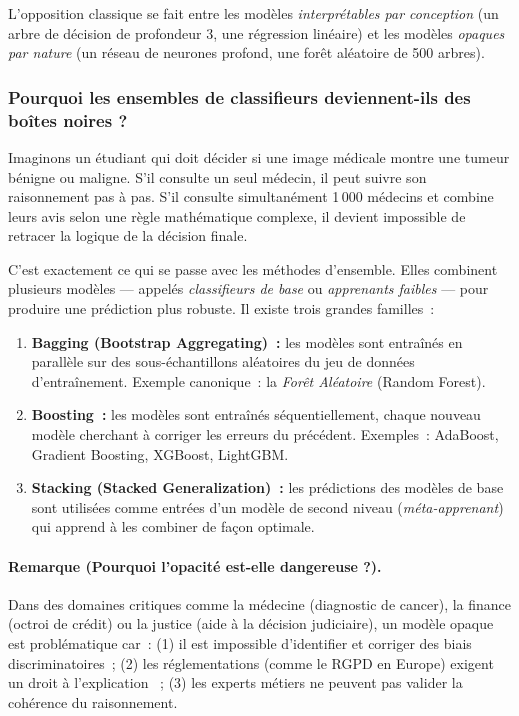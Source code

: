 L'opposition classique se fait entre les modèles \textit{interprétables par conception}
(un arbre de décision de profondeur 3, une régression linéaire) et les modèles \textit{opaques
par nature} (un réseau de neurones profond, une forêt aléatoire de 500 arbres).

\subsubsection{Pourquoi les ensembles de classifieurs deviennent-ils des boîtes noires ?}

Imaginons un étudiant qui doit décider si une image médicale montre une tumeur bénigne
ou maligne. S'il consulte un seul médecin, il peut suivre son raisonnement pas à pas.
S'il consulte simultanément 1\,000 médecins et combine leurs avis selon une règle mathématique
complexe, il devient impossible de retracer la logique de la décision finale.

C'est exactement ce qui se passe avec les méthodes d'ensemble. Elles combinent plusieurs
modèles — appelés \textit{classifieurs de base} ou \textit{apprenants faibles} — pour
produire une prédiction plus robuste. Il existe trois grandes familles~:

\begin{enumerate}
  \item \textbf{Bagging (Bootstrap Aggregating)~:} les modèles sont entraînés en parallèle sur
        des sous-échantillons aléatoires du jeu de données d'entraînement. Exemple canonique~:
        la \textit{Forêt Aléatoire} (Random Forest).

  \item \textbf{Boosting~:} les modèles sont entraînés séquentiellement, chaque nouveau modèle
        cherchant à corriger les erreurs du précédent. Exemples~: AdaBoost, Gradient Boosting,
        XGBoost, LightGBM.

  \item \textbf{Stacking (Stacked Generalization)~:} les prédictions des modèles de base sont
        utilisées comme entrées d'un modèle de second niveau (\textit{méta-apprenant}) qui
        apprend à les combiner de façon optimale.
\end{enumerate}

\paragraph{Remarque (Pourquoi l'opacité est-elle dangereuse ?).}
Dans des domaines critiques comme la médecine (diagnostic de cancer), la finance (octroi
de crédit) ou la justice (aide à la décision judiciaire), un modèle opaque est problématique
car~: (1) il est impossible d'identifier et corriger des biais discriminatoires~; (2) les
réglementations (comme le RGPD en Europe) exigent un \og droit à l'explication \fg{}~;
(3) les experts métiers ne peuvent pas valider la cohérence du raisonnement.

